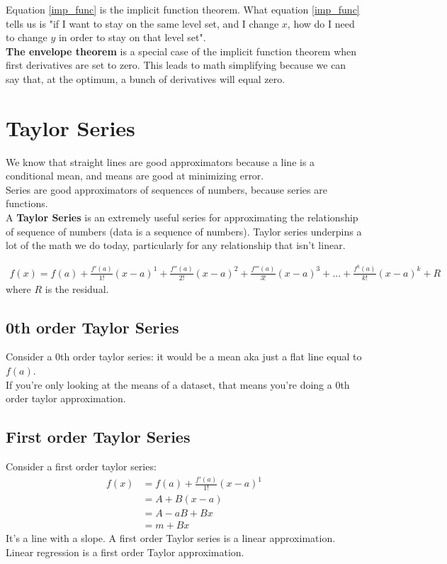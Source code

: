 \documentclass{article}
\begin{document}
Equation \ref{imp_func} is the implicit function theorem. What equation \ref{imp_func} tells us is "if I want to stay on the same level set, and I change $x$, how do I need to change $y$ in order to stay on that level set".\\


\textbf{The envelope theorem} is a special case of the implicit function theorem when first derivatives are set to zero. This leads to math simplifying because we can say that, at the optimum, a bunch of derivatives will equal zero. 

\section{Taylor Series}

We know that straight lines are good approximators because a line is a conditional mean, and means are good at minimizing error.\\

Series are good approximators of sequences of numbers, because series are functions. \\

A \textbf{Taylor Series} is an extremely useful series for approximating the relationship of sequence of numbers (data is a sequence of numbers). Taylor series underpins a lot of the math we do today, particularly for any relationship that isn't linear. 

\begin{align}
    f(x) = f(a) + \frac{f'(a)}{1!}(x-a)^1 + \frac{f''(a)}{2!}(x-a)^2 + \frac{f'''(a)}{3!}(x-a)^3 + ... + \frac{f^k(a)}{k!}(x-a)^k + R
\end{align}
where $R$ is the residual.\\


\subsection{0th order Taylor Series}
Consider a 0th order taylor series: it would be a mean aka just a flat line equal to $f(a)$. \\

If you're only looking at the means of a dataset, that means you're doing a 0th order taylor approximation.

\subsection{First order Taylor Series}

Consider a first order taylor series: 
\begin{align}
    f(x) &= f(a) + \frac{f'(a)}{1!}(x-a)^1 \\
    &= A + B (x-a) \\
    &= A -aB + Bx\\
    &= m + Bx
\end{align}
It's a line with a slope. A first order Taylor series is a linear approximation. Linear regression is a first order Taylor approximation. \\
\end{document}

